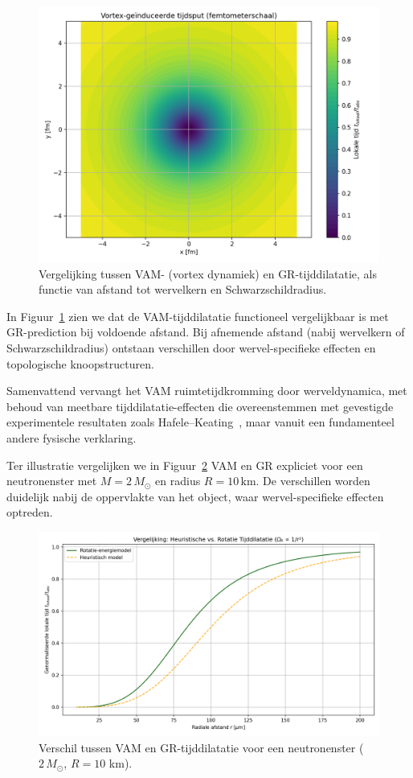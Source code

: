 \begin{figure}[ht!]
    \centering
    \includegraphics[width=0.7\linewidth]{02-RadialProfileOfLocalTimeDilation_Vortex-Induced_Time_Well_nl}
    \caption{Vergelijking tussen VAM- (vortex dynamiek) en GR-tijddilatatie, als functie van afstand tot wervelkern en Schwarzschildradius.}
    \label{fig:vergelijking_VAMGR}
\end{figure}

In Figuur~\ref{fig:vergelijking_VAMGR} zien we dat de VAM-tijddilatatie functioneel vergelijkbaar is met GR-prediction bij voldoende afstand. Bij afnemende afstand (nabij wervelkern of Schwarzschildradius) ontstaan verschillen door wervel-specifieke effecten en topologische knoopstructuren.

Samenvattend vervangt het VAM ruimtetijdkromming door werveldynamica, met behoud van meetbare tijddilatatie-effecten die overeenstemmen met gevestigde experimentele resultaten zoals Hafele–Keating~\cite{hafele1972around}, maar vanuit een fundamenteel andere fysische verklaring.


Ter illustratie vergelijken we in Figuur~\ref{fig:vergelijkingVAMGR} VAM en GR expliciet voor een neutronenster met $M = 2\,M_\odot$ en radius $R = 10\,\text{km}$. De verschillen worden duidelijk nabij de oppervlakte van het object, waar wervel-specifieke effecten optreden.

\begin{figure}[ht!]
    \centering
    \includegraphics[width=0.7\linewidth]{04-RotationalVsHeuristicTimeDilation_nl}
    \caption{Verschil tussen VAM en GR-tijddilatatie voor een neutronenster ($2\,M_\odot$, $R=10$ km).}
    \label{fig:vergelijkingVAMGR}
\end{figure}


